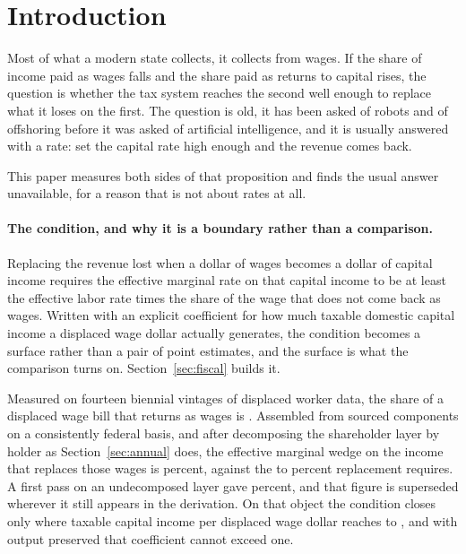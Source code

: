 \section{Introduction}
\label{sec:intro}

Most of what a modern state collects, it collects from wages. If the share of income paid as
wages falls and the share paid as returns to capital rises, the question is whether the tax
system reaches the second well enough to replace what it loses on the first. The question is old,
it has been asked of robots and of offshoring before it was asked of artificial intelligence, and
it is usually answered with a rate: set the capital rate high enough and the revenue comes back.

This paper measures both sides of that proposition and finds the usual answer unavailable, for a
reason that is not about rates at all.

\paragraph{The condition, and why it is a boundary rather than a comparison.} Replacing the
revenue lost when a dollar of wages becomes a dollar of capital income requires the effective
marginal rate on that capital income to be at least the effective labor rate times the share of
the wage that does not come back as wages. Written with an explicit coefficient for how much
taxable domestic capital income a displaced wage dollar actually generates, the condition becomes
a surface rather than a pair of point estimates, and the surface is what the comparison turns on.
Section~\ref{sec:fiscal} builds it.

Measured on fourteen biennial vintages of displaced worker data, the share of a displaced wage
bill that returns as wages is . Assembled from sourced components on a
consistently federal basis, and after decomposing the shareholder layer by holder as
Section~\ref{sec:annual} does, the effective marginal wedge on the income that replaces those
wages is  percent, against the  to 
percent replacement requires. A first pass on an undecomposed layer gave  percent,
and that figure is superseded wherever it still appears in the derivation. On that object the condition closes only
where taxable capital income per displaced wage dollar reaches  to
, and with output preserved that coefficient cannot exceed one.

